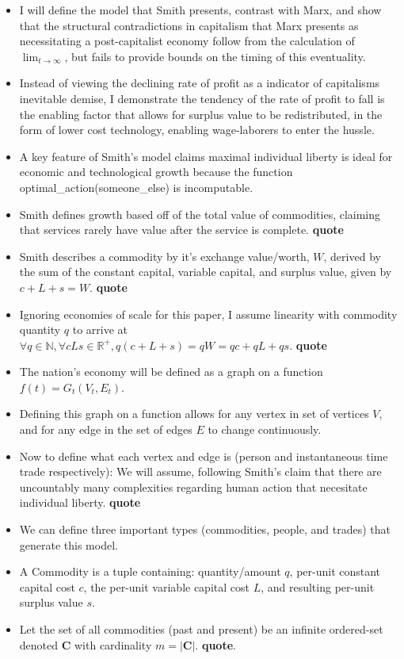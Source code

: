 \documentclass[12pt]{article}
\begin{document}
\begin{itemize}
    \item I will define the model that Smith presents, contrast with Marx, and show that the structural contradictions in capitalism that Marx presents as necessitating a post-capitalist economy follow from the calculation of $\lim_{t \to \infty}$, but fails to provide bounds on the timing of this eventuality. 
    \item Instead of viewing the declining rate of profit as a indicator of capitalisms inevitable demise, I demonstrate the tendency of the rate of profit to fall is the enabling factor that allows for surplus value to be redistributed, in the form of lower cost technology, enabling wage-laborers to enter the hussle.
    \item A key feature of Smith's model claims maximal individual liberty is ideal for economic and technological growth because the function optimal\_action(someone\_else) is incomputable. 
    \item Smith defines growth based off of the total value of commodities, claiming that services rarely have value after the service is complete. \textbf{quote}
    \item Smith describes a commodity by it's exchange value/worth, $W$, derived by the sum of the constant capital, variable capital, and surplus value, given by $c + L + s = W$. \textbf{quote}
    \item Ignoring economies of scale for this paper, I assume linearity with commodity quantity $q$ to arrive at $\forall q \in \mathbb{N}, \forall{cLs} \in \mathbb{R^{+}}, q(c + L + s) = qW = qc + qL + qs $. \textbf{quote}
    \item The nation's economy will be defined as a graph on a function $f(t) = G_t(V_t, E_t)$. 
    \item Defining this graph on a function allows for any vertex in set of vertices $V$, and for any edge in the set of edges $E$ to change continuously.
    \item Now to define what each vertex and edge is (person and instantaneous time trade respectively): We will assume, following Smith's claim that there are uncountably many complexities regarding human action that necesitate individual liberty. \textbf{quote} 
    \item We can define three important types (commodities, people, and trades) that generate this model. 
    \item A Commodity is a tuple containing: quantity/amount $q$, per-unit constant capital cost $c$, the per-unit variable capital cost $L$, and resulting per-unit surplus value $s$. 
	\item Let the set of all commodities (past and present) be an infinite ordered-set denoted $\boldsymbol{C}$ with cardinality $m = |\boldsymbol{C}|$. \textbf{quote}.
 

\end{itemize}
\end{document}
